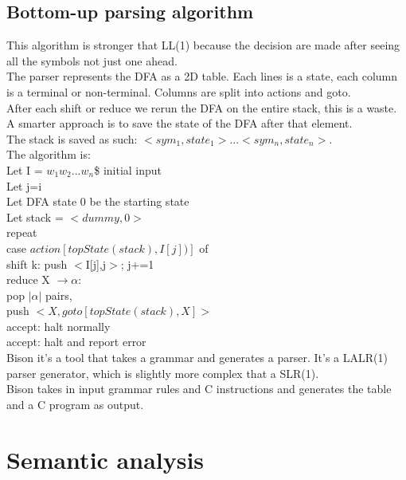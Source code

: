 \documentclass[12pt]{article}
\begin{document}
\subsection{Bottom-up parsing algorithm}
This algorithm is stronger that LL(1) because the decision are made after seeing all the symbols not just one ahead.
\\ The parser represents the DFA as a 2D table. Each lines is a state, each column is a terminal or non-terminal. Columns are split into actions and goto.
\\ After each shift or reduce we rerun the DFA on the entire stack, this is a waste. A smarter approach is to save the state of the DFA after that element. 
\\ The stack is saved as such: $<sym_1, state_1> ...< sym_n, state_n>$.
\\ The algorithm is:
\\ Let I = $w_1w_2...w_n$\$ initial input
\\ Let j=i
\\ Let DFA state 0 be the starting state 
\\ Let stack = $< dummy, 0 >$
\\ \hspace{4mm} repeat
\\ \hspace{8mm} case $action[topState(stack), I[j])]$ of 
\\ \hspace{12mm} shift k: push $<$I[j],j$>$; j+=1
\\ \hspace{12mm} reduce X $\rightarrow \alpha$:
\\ \hspace{16mm} pop $|\alpha|$ pairs, 
\\ \hspace{16mm} push $< X, goto[topState(stack),X]>$
\\ \hspace{12mm} accept: halt normally
\\ \hspace{12mm} accept: halt and report error
\vspace{3mm}
\\ Bison it's a tool that takes a grammar and generates a parser. It's a LALR(1) parser generator, which is slightly more complex that a SLR(1).
\\ Bison takes in input grammar rules and C instructions and generates the table and a C program as output. 

\section{Semantic analysis}
\end{document}
